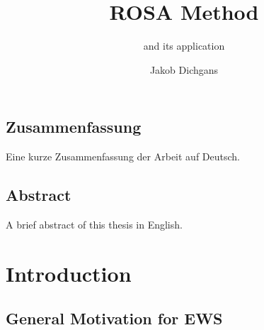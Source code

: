 \documentclass[%
thesis=student,%
coverpage=false,%
titlepage=false,%
headmarks=true, %
german,%
font=libertine, %
math=newpxtx, %
BCOR=5mm,%
coverBCOR=11mm%
]{tumbook}
\title{ROSA Method}
\subtitle{and its application}
\author{Jakob Dichgans}
\begin{document}
\frontmatter
\maketitle

\section*{Zusammenfassung}
Eine kurze Zusammenfassung der Arbeit auf Deutsch.

\section*{Abstract}
A brief abstract of this thesis in English.

\cleardoublepage{}

\tableofcontents

\mainmatter{}
\chapter{Introduction}

\section{General Motivation for EWS}%
\label{sec:first-sect-intr}
\end{document}
